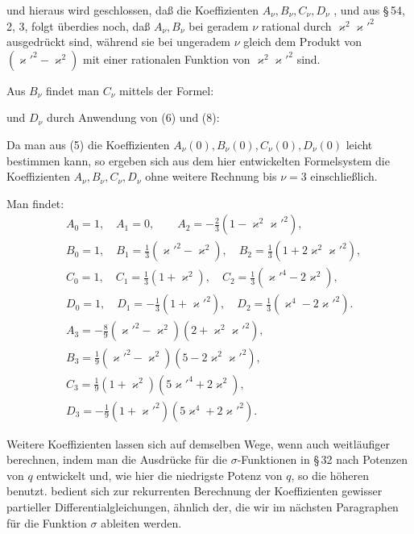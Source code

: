 
und hieraus wird geschlossen, daß die Koeffizienten $A_\nu, B_\nu, C_\nu, D_\nu$
, und
aus \S\,54, 2, 3, folgt überdies noch, daß $A_\nu, B_\nu$ bei geradem $\nu$
rational durch $\varkappa^2\varkappa'^2$ ausgedrückt sind, während sie bei ungeradem
$\nu$ gleich dem Produkt von $(\varkappa'^2-\varkappa^2)$ mit einer rationalen Funktion
 von $\varkappa^2\varkappa'^2$ sind.

Aus $B_\nu$ findet man $C_\nu$ mittels der Formel:


und $D_\nu$ durch Anwendung von (6) und (8):


Da man aus (5) die Koeffizienten $A_\nu(0), B_\nu(0), C_\nu(0), D_\nu(0)$
leicht bestimmen kann, so ergeben sich aus dem hier entwickelten
Formelsystem die Koeffizienten $A_\nu, B_\nu, C_\nu, D_\nu$ ohne
weitere Rechnung bis $\nu=3$ einschließlich.

Man findet:
\[
\begin{aligned}
&A_0=1, \quad A_1=0, \qquad A_2=-\frac{2}{3}(1-\varkappa^2\varkappa'^2),\\
&B_0=1, \quad B_1=\frac{1}{3}(\varkappa'^2-\varkappa^2), \quad B_2=\frac{1}{3}(1+2\varkappa^2\varkappa'^2),\\
&C_0=1, \quad C_1=\frac{1}{3}(1+\varkappa^2), \quad C_2=\frac{1}{3}(\varkappa'^4-2\varkappa^2),\\
&D_0=1, \quad D_1=-\frac{1}{3}(1+\varkappa'^2), \quad D_2=\frac{1}{3}(\varkappa^4-2\varkappa'^2).\\
&A_3=-\frac{8}{9}(\varkappa'^2-\varkappa^2)(2+\varkappa^2\varkappa'^2),\\
&B_3=\frac{1}{9}(\varkappa'^2-\varkappa^2)(5-2\varkappa^2\varkappa'^2),\\
&C_3=\frac{1}{9}(1+\varkappa^2)(5\varkappa'^4+2\varkappa^2),\\
&D_3=-\frac{1}{9}(1+\varkappa'^2)(5\varkappa^4+2\varkappa'^2).
\end{aligned}
\]

Weitere Koeffizienten lassen sich auf demselben Wege, wenn
auch weitläufiger berechnen, indem man die Ausdrücke für die
$\sigma$-Funktionen in \S\,32 nach Potenzen von $q$ entwickelt und, wie
hier die niedrigste Potenz von $q$, so die höheren benutzt. 
bedient sich zur rekurrenten Berechnung der Koeffizienten
gewisser partieller Differentialgleichungen, ähnlich der, die wir im
nächsten Paragraphen für die Funktion $\sigma$ ableiten werden.

